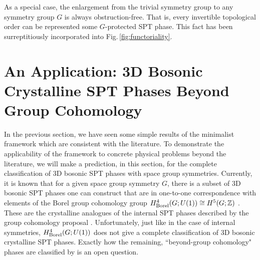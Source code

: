 \documentclass[sort&compress]{elsarticle}
\theoremstyle{theoremstyle}
\theoremstyle{framedtheoremstyle}
\theoremstyle{definitionstyle}
\theoremstyle{definitionstyle}
\theoremstyle{definitionstyle}
\theoremstyle{definitionstyle}
\theoremstyle{nameddefinitionstyle}
\theoremstyle{framednameddefinitionstyle}
\theoremstyle{proofstyle}
\theoremstyle{definitionstyle}
\newcommand{\ZZZ}{\mathbb{Z}}
\newcommand{\isomorphic}{\cong}
\begin{document}
As a special case, the enlargement from the trivial symmetry group to any symmetry group $G$ is always obstruction-free. That is, every invertible topological order can be represented some $G$-protected SPT phase. This fact has been surreptitiously incorporated into Fig.\,\ref{fig:functoriality}.









\section{An Application: 3D Bosonic Crystalline SPT Phases Beyond Group Cohomology\label{sec:an_application}}

In the previous section, we have seen some simple results of the minimalist framework which are consistent with the literature. To demonstrate the applicability of the framework to concrete physical problems beyond the literature, we will make a prediction, in this section, for the complete classification of 3D bosonic SPT phases with space group symmetries. Currently, it is known that for a given space group symmetry $G$, there is a subset of 3D bosonic SPT phases one can construct that are in one-to-one correspondence with elements of the Borel group cohomology group $H^4_{\rm Borel}(G;U(1)) \isomorphic H^5(G;\ZZZ)$ \cite{Huang_dimensional_reduction, Thorngren_sgSPT}. These are the crystalline analogues of the internal SPT phases described by the group cohomology proposal \cite{Wen_Boson}. Unfortunately, just like in the case of internal symmetries, $H^4_{\rm Borel}(G;U(1))$ does not give a complete classification of 3D bosonic crystalline SPT phases. Exactly how the remaining, ``beyond-group cohomology" phases are classified by is an open question.
\end{document}
